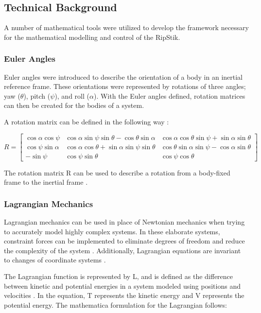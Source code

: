 \subsection{Technical Background}
A number of mathematical tools were utilized to develop the framework necessary for the mathematical modelling and control of the RipStik.

\subsubsection{Euler Angles}

Euler angles were introduced to describe the orientation of a body in an inertial reference frame.
These orientations were represented by rotations of three angles; yaw ($\theta$), pitch ($\psi$), and roll ($\alpha$).
With the Euler angles defined, rotation matrices can then be created for the bodies of a system.

A rotation matrix can be defined in the following way \cite{Lewis}:

\begin{equation}
\label{eq:RotM}
R =
\begin{bmatrix} 
\cos\alpha\cos\psi & \cos\alpha\sin\psi\sin\theta - \cos\theta\sin\alpha &\cos\alpha\cos\theta\sin\psi+\sin\alpha\sin\theta\\
\cos\psi\sin\alpha & \cos\alpha\cos\theta+\sin\alpha\sin\psi\sin\theta & \cos\theta\sin\alpha\sin\psi - \cos\alpha\sin\theta\\
-\sin\psi & \cos\psi\sin\theta & \cos\psi\cos\theta 
\end{bmatrix}
\end{equation}

The rotation matrix R can be used to describe a rotation from a body-fixed frame to the inertial frame \cite{VTOL}.

\subsubsection{Lagrangian Mechanics}

Lagrangian mechanics can be used in place of Newtonian mechanics when trying to accurately model highly complex systems.
In these elaborate systems, constraint forces can be implemented to eliminate degrees of freedom and reduce the complexity of the system \cite{LagrangeEquations}. Additionally, Lagrangian equations are invariant to changes of coordinate systems \cite{LagrangePowerpoint}.
\par
The Lagrangian function is represented by L, and is defined as the difference between kinetic and potential energies in a system modeled using positions and velocities \cite{NonholonomicPowerpoint}.
In the equation, T represents the kinetic energy and V represents the potential energy.
The mathematica formulation for the Lagrangian follows:

